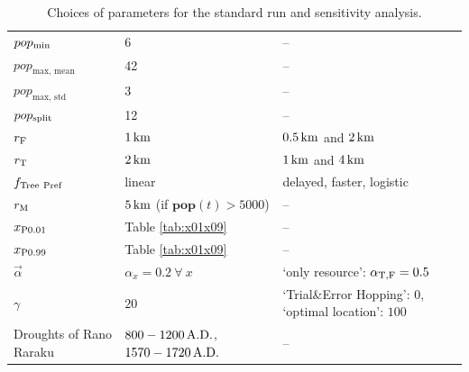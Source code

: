 \begin{table}
\begin{tabular}{l|L|K}
		  $pop_{\rm min}$ & 6 & --\\
		  $pop_\text{max, mean}$ & 42 & --\\
		  $pop_\text{max, std}$ & 3 & -- \\
		  $pop_{\rm split}$ & 12 & --\\ \hline
		  $r_{\rm F}$ & $1\, {\rm km}$ & $0.5\, {\rm km}$ and $2\, {\rm km}$\\
		  $r_{\rm T}$ & $2\, {\rm km}$ & $1\, {\rm km}$ and $4\, {\rm km}$  \\ \hline 
		  $f_{\rm Tree\  Pref}$ & linear & delayed, faster, logistic\\ \hline 
		  $r_{\rm M}$ & $5\, {\rm km}$ (if $\mathbf{pop}(t)>5000$) & -- \\
		  $x_{\rm P0.01}$ & Table \ref{tab:x01x09} & -- \\
		  $x_{\rm P0.99}$ & Table \ref{tab:x01x09} & -- \\
		  $\vec{\alpha}$ & $\alpha_x=0.2 \ \forall \ x$ & `only resource': $\alpha_{\rm T,F} = 0.5$\\
		  
		  $\gamma$ & $20$ & `Trial\&Error Hopping': $0$, `optimal location': $100$ \\
		  Droughts of Rano Raraku & $800-1200\, {\rm A.D.}$, $1570-1720\, {\rm A.D.}$ & -- \\
	\end{tabular}
	\caption{Choices of parameters for the standard run and sensitivity analysis. %
	}
	\label{tab:sensitivity}
\end{table}

